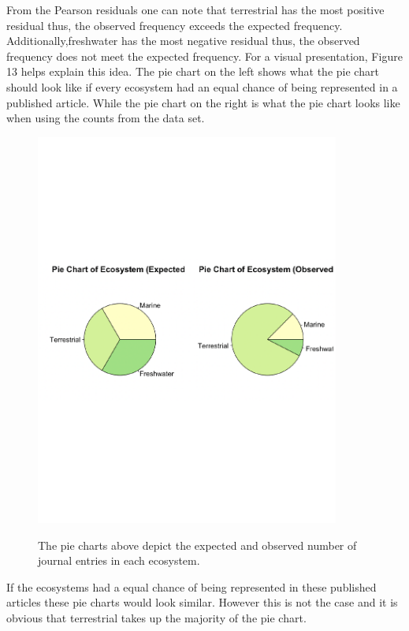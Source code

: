 \documentclass[12pt, letterpaper]{article}
\begin{document}
From the Pearson residuals one can note that terrestrial has the most positive residual thus, the observed frequency exceeds the expected frequency. Additionally,freshwater has the most negative residual thus, the observed frequency does not meet the expected frequency. For a visual presentation, Figure 13 helps explain this idea. The pie chart on the left shows what the pie chart should look like if every ecosystem had an equal chance of being represented in a published article. While the pie chart on the right is what the pie chart looks like when using the counts from the data set. 

\begin{figure}[h]
\begin{center}
	\includegraphics[width=10cm]{pie-eco-1.pdf}
	\label{fig: Expected Frequency vs Observed Frequency}
	\caption{The pie charts above depict the expected and observed number of journal entries in each ecosystem.}
\end{center}
\end{figure}
If the ecosystems 
had a equal chance of being represented in these published articles these pie charts would look similar. However this is not the case and it is obvious that terrestrial takes up the majority of the pie chart. 
\end{document}
